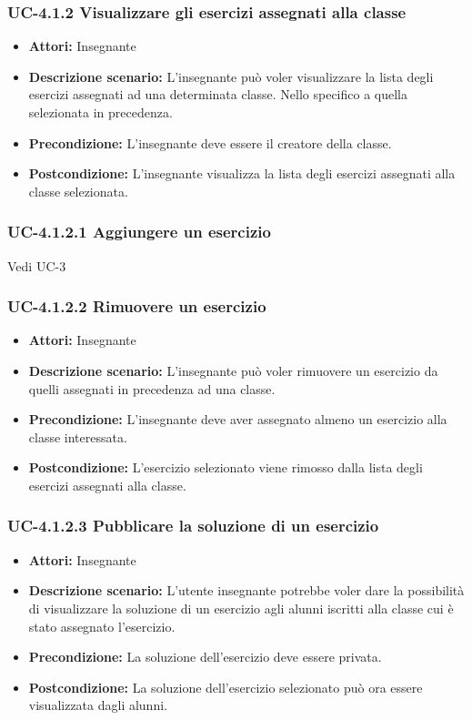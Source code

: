 \subsubsection{UC-4.1.2 Visualizzare gli esercizi assegnati alla classe}
\begin{itemize}
		\item \textbf{Attori: } Insegnante
		\item \textbf{Descrizione scenario: } L'insegnante può voler visualizzare la lista degli esercizi assegnati ad una determinata classe. Nello specifico a quella selezionata in precedenza.
		\item \textbf{Precondizione: }  L'insegnante deve essere il creatore della classe.
		\item \textbf{Postcondizione: } L'insegnante visualizza la lista degli esercizi assegnati alla classe selezionata. 
	\end{itemize}
\subsubsection{UC-4.1.2.1 Aggiungere un esercizio}
Vedi UC-3
\subsubsection{UC-4.1.2.2 Rimuovere un esercizio}
\begin{itemize}
		\item \textbf{Attori: } Insegnante
		\item \textbf{Descrizione scenario: } L'insegnante può voler rimuovere un esercizio da quelli assegnati in precedenza ad una classe.
		\item \textbf{Precondizione: }  L'insegnante deve aver assegnato almeno un esercizio alla classe interessata.
		\item \textbf{Postcondizione: } L'esercizio selezionato viene rimosso dalla lista degli esercizi assegnati alla classe. 
	\end{itemize}
\subsubsection{UC-4.1.2.3 Pubblicare la soluzione di un esercizio}
\begin{itemize}
		\item \textbf{Attori: } Insegnante
		\item \textbf{Descrizione scenario: } L'utente insegnante potrebbe voler dare la possibilità di visualizzare la soluzione di un esercizio agli alunni iscritti alla classe cui è stato assegnato l'esercizio.
		\item \textbf{Precondizione: }  La soluzione dell'esercizio deve essere privata.
		\item \textbf{Postcondizione: } La soluzione dell'esercizio selezionato può ora essere visualizzata dagli alunni.
	\end{itemize}
